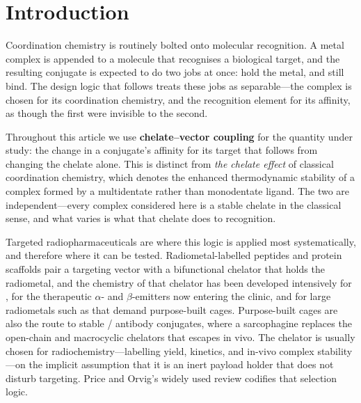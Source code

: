 \section{Introduction}

Coordination chemistry is routinely bolted onto molecular recognition. A metal complex is appended to a molecule that recognises a biological target, and the resulting conjugate is expected to do two jobs at once: hold the metal, and still bind. The design logic that follows treats these jobs as separable---the complex is chosen for its coordination chemistry, and the recognition element for its affinity, as though the first were invisible to the second.

Throughout this article we use \textbf{chelate--vector coupling} for the quantity under study: the change in a conjugate's affinity for its target that follows from changing the chelate alone. This is distinct from \emph{the chelate effect} of classical coordination chemistry, which denotes the enhanced thermodynamic stability of a complex formed by a multidentate rather than monodentate ligand. The two are independent---every complex considered here is a stable chelate in the classical sense, and what varies is what that chelate does to recognition.

Targeted radiopharmaceuticals are where this logic is applied most systematically, and therefore where it can be tested. Radiometal-labelled peptides and protein scaffolds pair a targeting vector with a bifunctional chelator that holds the radiometal, and the chemistry of that chelator has been developed intensively for ,\cite{Spang2023GaChelators,Sinnes2020b} for the therapeutic $\alpha$- and $\beta$-emitters now entering the clinic,\cite{Hennrich2026TAT,Mcneil2023Pb} and for large radiometals such as  that demand purpose-built cages.\cite{Deberle2025Th227} Purpose-built cages are also the route to stable / antibody conjugates, where a sarcophagine replaces the open-chain and macrocyclic chelators that  escapes in vivo.\cite{Rudd2025ChemSci} The chelator is usually chosen for radiochemistry---labelling yield, kinetics, and in-vivo complex stability---on the implicit assumption that it is an inert payload holder that does not disturb targeting. Price and Orvig's widely used review codifies that selection logic.\cite{PriceOrvig2014}

